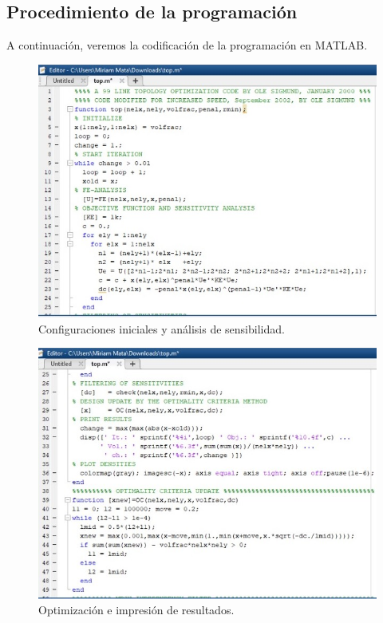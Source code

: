\documentclass{article}
\begin{document}
\subsection{Procedimiento de la programación}
A continuación, veremos la codificación de la programación en MATLAB.
\begin{figure}[htp] %
    \centering
    \includegraphics[width=140mm]{Codigo 1.jpeg} %
    \caption{Configuraciones iniciales y análisis de sensibilidad.}
    \label{grafica}
\end{figure}
\begin{figure}[htp] %
    \centering
    \includegraphics[width=140mm]{Codigo 2.jpeg} %
    \caption{Optimización e impresión de resultados.}
    \label{grafica}
\end{figure}
\end{document}
